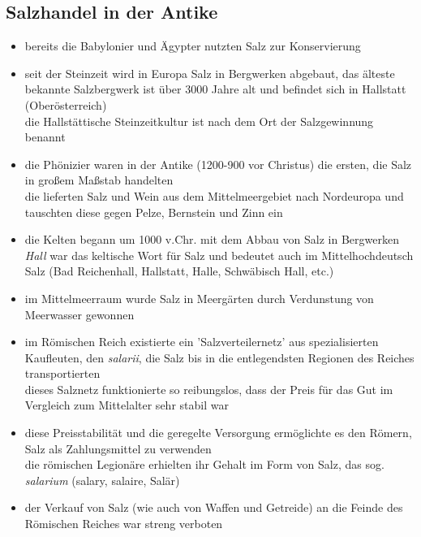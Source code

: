 \documentclass[11pt,a4paper]{article}
\begin{document}
\subsection*{\textsf{Salzhandel in der Antike}}

\begin{itemize}

\item bereits die Babylonier und Ägypter nutzten Salz zur Konservierung

\item seit der Steinzeit wird in Europa Salz in Bergwerken abgebaut, das älteste bekannte Salzbergwerk ist über 3000 Jahre alt und befindet sich in Hallstatt (Oberösterreich)\\
 die Hallstättische Steinzeitkultur ist nach dem Ort der Salzgewinnung benannt

\item die Phönizier waren in der Antike (1200-900 vor Christus) die ersten, die Salz in großem Maßstab handelten\\
 die lieferten Salz und Wein aus dem Mittelmeergebiet nach Nordeuropa und tauschten diese gegen Pelze, Bernstein und Zinn ein

\item die Kelten begann um 1000 v.Chr. mit dem Abbau von Salz in Bergwerken\\
 \textsl{Hall} war das keltische Wort für Salz und bedeutet auch im Mittelhochdeutsch Salz (Bad Reichenhall, Hallstatt, Halle, Schwäbisch Hall, etc.)

\item im Mittelmeerraum wurde Salz in Meergärten durch Verdunstung von Meerwasser gewonnen

\item im Römischen Reich existierte ein 'Salzverteilernetz' aus spezialisierten Kaufleuten, den \textsl{salarii}, die Salz bis in die entlegendsten Regionen des Reiches transportierten\\
 dieses Salznetz funktionierte so reibungslos, dass der Preis für das Gut im Vergleich zum Mittelalter sehr stabil war


\item diese Preisstabilität und die geregelte Versorgung ermöglichte es den Römern, Salz als Zahlungsmittel zu verwenden\\
 die römischen Legionäre erhielten ihr Gehalt im Form von Salz, das sog. \textsl{salarium} (salary, salaire, Salär)


\item der Verkauf von Salz (wie auch von Waffen und Getreide) an die Feinde des Römischen Reiches war streng verboten


\end{itemize}
\end{document}
